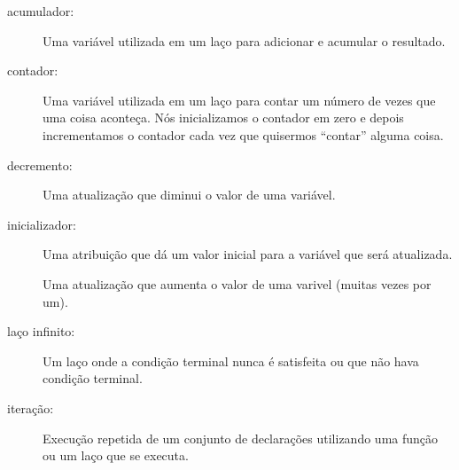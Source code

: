 \begin{description}

\item[acumulador:] Uma variável utilizada em um laço para adicionar e
	acumular o resultado.


\item[contador:] Uma variável utilizada em um laço para contar um número
	de vezes que uma coisa aconteça. Nós inicializamos o contador em zero e
	depois incrementamos o contador cada vez que quisermos ``contar'' alguma
	coisa.


\item[decremento:] Uma atualização que diminui o valor de uma variável.


\item[inicializador:] Uma atribuição que dá um valor inicial para a variável
	que será atualizada.


\ite[incremento:] Uma atualização que aumenta o valor de uma varivel (muitas
vezes por um).


\item[laço infinito:] Um laço onde a condição terminal nunca é satisfeita ou
	que não hava condição terminal.

\item[iteração:] Execução repetida de um conjunto de declarações utilizando
	uma função ou um laço que se executa.

\end{description}


